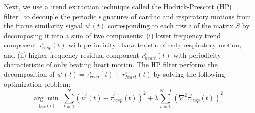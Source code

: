 \documentclass[journal]{IEEEtran}
\newcommand{\argmin}[1]{\underset{#1}{\operatorname{arg}\operatorname{min}}\;}
\begin{document}
Next, we use a trend extraction technique called the Hodrick-Prescott (HP) filter~\cite{Alexandrov2012} to decouple the periodic signatures of cardiac and respiratory motions from the frame similarity signal $u^i(t)$ corresponding to each row $i$ of the matrix $S$ by decomposing it into a sum of two components: (i) lower frequency trend component $\tau^i_{resp}(t)$ with periodicity characteristic of only respiratory motion, and (ii) higher frequency residual component $r^i_{heart}(t)$ with periodicity characteristic of only beating heart motion. The HP filter performs the decomposition of $u^i(t) = \tau^i_{resp}(t) + r^i_{heart}(t)$ by solving the following optimization problem:
\begin{equation}
\label{eqn:trend_extraction}
\argmin{\tau^i_{resp}(t)} \sum_{t=1}^{N}  \left(u^i(t) - \tau^i_{resp}(t) \right)^2  + \lambda \sum_{t=1}^{N-1} \left( \nabla^2 \tau^i_{resp}(t) \right)^2
\end{equation}
\end{document}

